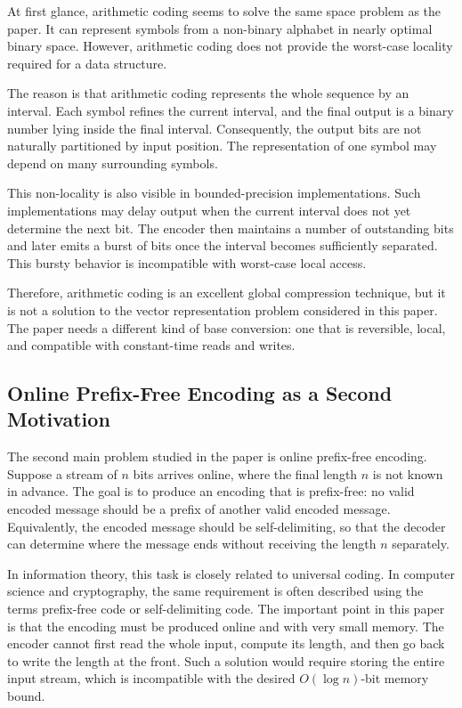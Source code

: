 At first glance, arithmetic coding seems to solve the same space problem as the paper. It can represent symbols from a non-binary alphabet in nearly optimal binary space. However, arithmetic coding does not provide the worst-case locality required for a data structure.

The reason is that arithmetic coding represents the whole sequence by an interval. Each symbol refines the current interval, and the final output is a binary number lying inside the final interval. Consequently, the output bits are not naturally partitioned by input position. The representation of one symbol may depend on many surrounding symbols.

This non-locality is also visible in bounded-precision implementations. Such implementations may delay output when the current interval does not yet determine the next bit. The encoder then maintains a number of outstanding bits and later emits a burst of bits once the interval becomes sufficiently separated. This bursty behavior is incompatible with worst-case local access.

Therefore, arithmetic coding is an excellent global compression technique, but it is not a solution to the vector representation problem considered in this paper. The paper needs a different kind of base conversion: one that is reversible, local, and compatible with constant-time reads and writes.

\subsection{Online Prefix-Free Encoding as a Second Motivation}

The second main problem studied in the paper is online prefix-free encoding. Suppose a stream of \(n\) bits arrives online, where the final length \(n\) is not known in advance. The goal is to produce an encoding that is prefix-free: no valid encoded message should be a prefix of another valid encoded message. Equivalently, the encoded message should be self-delimiting, so that the decoder can determine where the message ends without receiving the length \(n\) separately.

In information theory, this task is closely related to universal coding. In computer science and cryptography, the same requirement is often described using the terms prefix-free code or self-delimiting code. The important point in this paper is that the encoding must be produced online and with very small memory. The encoder cannot first read the whole input, compute its length, and then go back to write the length at the front. Such a solution would require storing the entire input stream, which is incompatible with the desired \(O(\log n)\)-bit memory bound.


